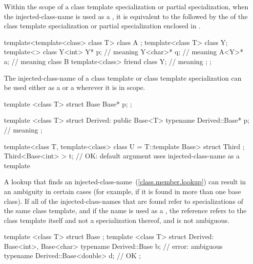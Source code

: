 \pnum
Within the scope of a class template specialization or
partial specialization, when the injected-class-name is
used as a ,
it is equivalent to the  followed by the
of the class template specialization or partial
specialization enclosed in
\tcode{<>}.
\begin{example}
\begin{codeblock}
template<template<class> class T> class A { };
template<class T> class Y;
template<> class Y<int> {
  Y* p;                               // meaning 
  Y<char>* q;                         // meaning 
  A<Y>* a;                            // meaning 
  class B {
    template<class> friend class Y;   // meaning 
  };
};
\end{codeblock}
\end{example}

\pnum
The injected-class-name of a class template or class
template specialization can be used either
as a  or a 
wherever it is in scope.
\begin{example}

\begin{codeblock}
template <class T> struct Base {
  Base* p;
};

template <class T> struct Derived: public Base<T> {
  typename Derived::Base* p;    // meaning 
};

template<class T, template<class> class U = T::template Base> struct Third { };
Third<Base<int> > t;            // OK: default argument uses injected-class-name as a template
\end{codeblock}
\end{example}

\pnum
A lookup that finds an injected-class-name~(\ref{class.member.lookup}) can result in an ambiguity in
certain cases (for example, if it is found in more than one
base class).
If all of the injected-class-names that are
found refer to specializations of the same class template,
and if the name
is used as a ,
the reference refers to the class template itself and not a
specialization thereof, and is not ambiguous.
\begin{example}

\begin{codeblock}
template <class T> struct Base { };
template <class T> struct Derived: Base<int>, Base<char> {
  typename Derived::Base b;             // error: ambiguous
  typename Derived::Base<double> d;     // OK
};
\end{codeblock}
\end{example}

